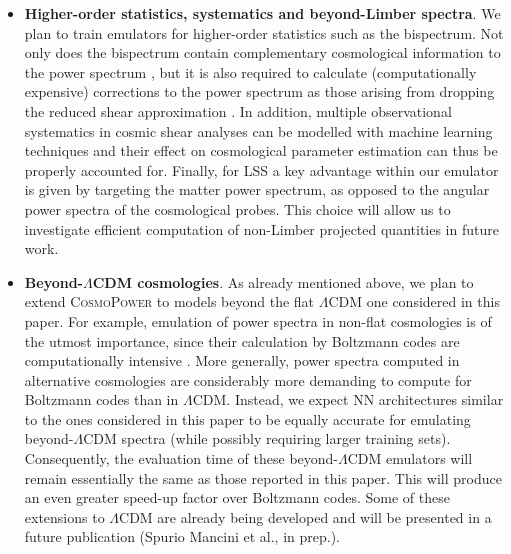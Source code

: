 \documentclass[fleqn,usenatbib]{mnras}
\begin{document}
\begin{itemize}
    \item \textbf{Higher-order statistics, systematics and beyond-Limber spectra}. We plan to train emulators for higher-order statistics such as the bispectrum. Not only does the bispectrum contain complementary cosmological information to the power spectrum \citep[see e.g.][]{Pyne21}, but it is also required to calculate (computationally expensive) corrections to the power spectrum as those arising from dropping the reduced shear approximation \citep{Deshpande20}. In addition, multiple observational systematics in cosmic shear analyses \citep[see e.g.][]{Paykari20} can be modelled with machine learning techniques and their effect on cosmological parameter estimation can thus be properly accounted for. Finally, for LSS a key advantage within our emulator is given by targeting the matter power spectrum, as opposed to the angular power spectra of the cosmological probes. This choice will allow us to investigate efficient computation of non-Limber projected quantities in future work.

\smallskip

   \item \textbf{Beyond-$\Lambda$CDM cosmologies}. As already mentioned above, we plan to extend \textsc{CosmoPower} to models beyond the flat $\Lambda$CDM one considered in this paper. For example, emulation of power spectra in non-flat cosmologies is of the utmost importance, since their calculation by Boltzmann codes are computationally intensive \citep[see e.g.][]{Handley21}.
   More generally, power spectra computed in alternative cosmologies are considerably more demanding to compute for Boltzmann codes than in $\Lambda$CDM. Instead, we expect NN architectures similar to the ones considered in this paper to be equally accurate for emulating beyond-$\Lambda$CDM spectra (while possibly requiring larger training sets). Consequently, the evaluation time of these beyond-$\Lambda$CDM emulators will remain essentially the same as those reported in this paper. This will produce an even greater speed-up factor over Boltzmann codes. Some of these extensions to $\Lambda$CDM are already being developed and will be presented in a future publication (Spurio Mancini et al., in prep.).

\smallskip


\end{itemize}
\end{document}

